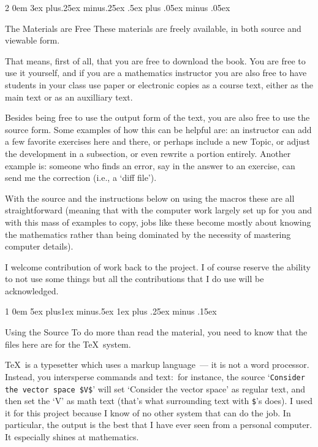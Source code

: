 \documentclass[titlepage]{article}
\makeatletter
\renewcommand{\section}{\@startsection{section}%
  {1}%
  {0em}%
  {5ex plus1ex minus.5ex}%
  {1ex plus .25ex minus .15ex}%
  {\Large\bfseries\raggedright}}
\renewcommand{\subsection}{\@startsection{subsection}%
  {2}%
  {0em}%
  {3ex plus.25ex minus.25ex}%
  {.5ex plus .05ex minus .05ex}%
  {\large\bfseries\raggedright}}
\makeatother
\begin{document}
\subsection{The Materials are Free}
These materials are freely available, in both source and viewable form.

That means, first of all, that you are free to download the book.
You are free to use it yourself, and if you are a mathematics
instructor you are also free to have students in your class 
use paper or electronic copies as a course text,
either as the main text or as an auxilliary text. 

Besides being free to use the output form of the text, you are
also free to use the source form.
Some examples of how this can be helpful are:
an instructor can add a few favorite exercises 
here and there, or perhaps include a new Topic, or adjust the development
in a subsection, or even rewrite a portion entirely.
Another example is: someone who finds an error, say in the answer to an
exercise, can send me the correction (i.e., a `diff file').

With the source and the instructions below on using the macros
these are all straightforward 
(meaning that with the computer work largely set up for you
and with this mass of examples to copy, jobs like these become
mostly about knowing the mathematics rather than being
dominated by the necessity of mastering computer details).  

I welcome contribution of work back to the project.
I of course reserve the ability to not use some things but all
the contributions that I do use will be acknowledged.














\section{Using the Source}
To do more than read the material, 
you need to know that the files here are for the \TeX\ system.

\TeX\ is a typesetter which uses a markup language~--- it is not a 
word processor.
Instead, you intersperse commands and text:~for instance, 
the source `\verb!Consider the vector space $V$!' 
will set `Consider the vector space' as regular text, 
and then set the `V' as math text 
(that's what surrounding text with \verb!$!'s does).
I used it for this project because I know of no
other system that can do the job.
In particular, the output is the best that I have ever seen
from a personal computer.
It especially shines at mathematics.
\end{document}
